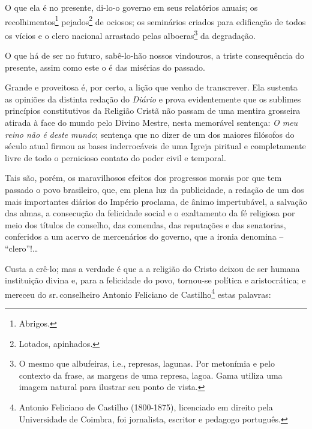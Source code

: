 O que ela é no presente, di-lo-o governo em seus relatórios anuais; os
recolhimentos\footnote{Abrigos.} pejados\footnote{Lotados,
  apinhados.} de ociosos; os seminários criados para edificação de todos
os vícios e o clero nacional arrastado pelas alboeras\footnote{O mesmo
  que albufeiras, i.e., represas, lagunas. Por metonímia e pelo contexto
  da frase, as margens de uma represa, lagoa. Gama utiliza uma imagem
  natural para ilustrar seu ponto de vista.} da degradação.

O que há de ser no futuro, sabê-lo-hão nossos vindouros, a triste
consequência do presente, assim como este o é das misérias do passado.

Grande e proveitosa é, por certo, a lição que venho de transcrever. Ela
sustenta as opiniões da distinta redação do \emph{Diário} e prova
evidentemente que os sublimes princípios constitutivos da Religião
Cristã não passam de uma mentira grosseira atirada à face do mundo pelo
Divino Mestre, nesta memorável sentença: \emph{O meu reino não é deste
mundo}; sentença que no dizer de um dos maiores filósofos do século
atual firmou as bases inderrocáveis de uma Igreja piritual e 
completamente livre de todo o pernicioso contato do poder civil e
temporal.

Tais são, porém, os maravilhosos efeitos dos progressos morais por que
tem passado o povo brasileiro, que, em plena luz da publicidade, a
redação de um dos mais importantes diários do Império proclama, de ânimo
impertubável, a salvação das almas, a consecução da felicidade social e
o exaltamento da fé religiosa por meio dos títulos de conselho, das
comendas, das reputações e das senatorias, conferidos a um acervo de
mercenários do governo, que a ironia denomina -- ``clero''!\ldots{}

Custa a crê-lo; mas a verdade é que a a religião do Cristo deixou de ser
humana instituição divina e, para a felicidade do povo, tornou-se
política e aristocrática; e mereceu do sr.\,conselheiro Antonio Feliciano
de Castilho\footnote{Antonio Feliciano de Castilho (1800-1875),
  licenciado em direito pela Universidade de Coimbra, foi jornalista,
  escritor e pedagogo português.} estas palavras:


